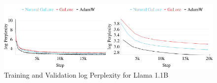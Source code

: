 \begin{figure}[ht]
    \centering
    \vspace{-2.5mm}
    \includegraphics[width=\linewidth]{figures/train_and_validate.pdf}
    \vspace{-5.5mm}
    \caption{\small{Training and Validation log Perplexity for Llama 1.1B
    }}
    \vspace{-5mm}
    \label{fig:train_loss}
\end{figure}
